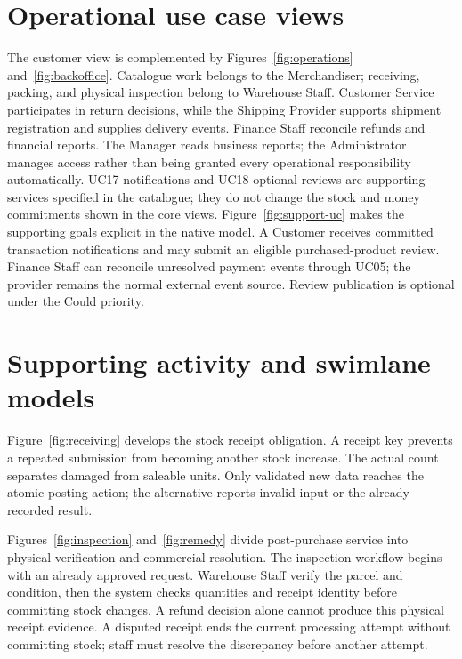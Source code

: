 \section{Operational use case views}
The customer view is complemented by Figures~\ref{fig:operations} and~\ref{fig:backoffice}. Catalogue work belongs to the Merchandiser; receiving, packing, and physical inspection belong to Warehouse Staff. Customer Service participates in return decisions, while the Shipping Provider supports shipment registration and supplies delivery events. Finance Staff reconcile refunds and financial reports. The Manager reads business reports; the Administrator manages access rather than being granted every operational responsibility automatically. UC17 notifications and UC18 optional reviews are supporting services specified in the catalogue; they do not change the stock and money commitments shown in the core views.
Figure~\ref{fig:support-uc} makes the supporting goals explicit in the native model. A Customer receives committed transaction notifications and may submit an eligible purchased-product review. Finance Staff can reconcile unresolved payment events through UC05; the provider remains the normal external event source. Review publication is optional under the Could priority.

\section{Supporting activity and swimlane models}
Figure~\ref{fig:receiving} develops the stock receipt obligation. A receipt key prevents a repeated submission from becoming another stock increase. The actual count separates damaged from saleable units. Only validated new data reaches the atomic posting action; the alternative reports invalid input or the already recorded result.

Figures~\ref{fig:inspection} and~\ref{fig:remedy} divide post-purchase service into physical verification and commercial resolution. The inspection workflow begins with an already approved request. Warehouse Staff verify the parcel and condition, then the system checks quantities and receipt identity before committing stock changes. A refund decision alone cannot produce this physical receipt evidence. A disputed receipt ends the current processing attempt without committing stock; staff must resolve the discrepancy before another attempt.

